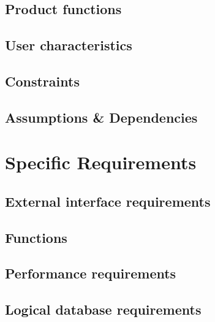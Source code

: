 \documentclass{report}
\begin{document}
  \newpage
  \section{Product functions}
  

  \newpage
  \section{User characteristics}
  
  
  \newpage
  \section{Constraints}
  
  
  \newpage
  \section{Assumptions \& Dependencies}
  
  \newpage
  
\chapter{Specific Requirements}



  \section{External interface requirements}
  

  \section{Functions}
  
  

  \newpage

  \section{Performance requirements}
  
  
  \section{Logical database requirements}
  
\end{document}
